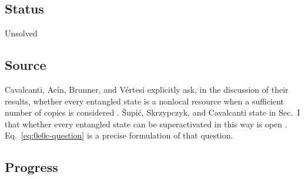 \subsection*{Status}

Unsolved

\subsection*{Source}

Cavalcanti, Ac\'in, Brunner, and V\'ertesi explicitly ask, in the discussion
of their results, whether every entangled state is a nonlocal resource when a
sufficient number of copies is considered .
\v{S}upi\'c, Skrzypczyk, and Cavalcanti state in Sec.~I that whether every
entangled state can be superactivated in this way is open
.  Eq.~\eqref{eq:0e0c-question} is a precise
formulation of that question.

\subsection*{Progress}

